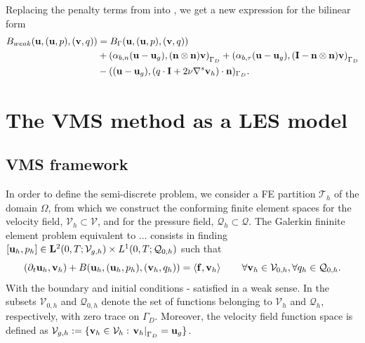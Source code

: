 Replacing the penalty terms from  into , we get a new expression for the bilinear form
\begin{align}
\label{eq-C7_bilinear_weak_by_components}
B_{weak}({\bf u},({\bf u},p),({\bf v},q))&=B_\Gamma({\bf u},({\bf u},p),({\bf v},q))\\\nonumber
&+\left(\alpha_{b,n}({\bf u}-{\bf u}_g),({\bf n}\otimes{\bf n}){\bf v}\right)_{\Gamma_D}+\left(\alpha_{b,\tau}({\bf u}-{\bf u}_g),(\mathbf{I}-{\bf n}\otimes{\bf n}){\bf v}\right)_{\Gamma_D}\\\nonumber
&-(({\bf u}-{\bf u}_g),(q\cdot\mathbf{I}+2\nu\nabla^s{\bf v}_h)\cdot{\bf n})_{\Gamma_D}.
\end{align}

\section{The VMS method as a LES model}
\label{sec-C7_VMS}
\subsection{VMS framework}
In order to define the semi-discrete problem, we consider a FE partition $ \mathcal{T}_h $ of the domain $ \Omega $, from which we construct the conforming finite element spaces for the velocity field, $ \mathcal{V}_h\subset\mathcal{V} $, and for the pressure field, $ \mathcal{Q}_h\subset\mathcal{Q} $. The Galerkin fininite element problem equivalent to ... consists in finding $[{\bf u}_h,p_h]\in\mathbf{L}^2(0,T;\mathcal{V}_{g,h})\times L^1(0,T;\mathcal{Q}_{0,h})$ such that
\begin{equation}
\label{eq-C7_NS_galerkin}
(\partial_t{\bf u}_h,{\bf v}_h)+B({\bf u}_h,({\bf u}_h,p_h),({\bf v}_h,q_h)) =\left<{\bf f},{\bf v}_h\right>
\quad\quad\forall{\bf v}_h\in\mathcal{V}_{0,h},\forall q_h\in\mathcal{Q}_{0,h}.
\end{equation}
With the boundary and initial conditions - satisfied in a weak sense. In  the subsets $ \mathcal{V}_{0,h} $ and $ \mathcal{Q}_{0,h} $ denote the set of functions belonging to $ \mathcal{V}_h $ and $ \mathcal{Q}_h $, respectively, with zero trace on $ \Gamma_D $. Moreover, the velocity field function space is defined as $ \mathcal{V}_{g,h}:=\lbrace{\bf v}_h\in\mathcal{V}_h: \left.{\bf v}_h\right|_{\Gamma_D}={\bf u}_g\rbrace $.

